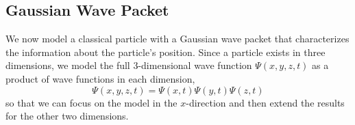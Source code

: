 \subsection{Gaussian Wave Packet}

We now model a classical particle with a Gaussian  wave packet that characterizes the information about the particle's position.  Since a particle exists in three dimensions, we model the full 3-dimensional wave function $\Psi(x,y,z,t)$ as a product of wave functions in each dimension,
%
\begin{equation}
\Psi(x,y,z,t) = \Psi(x,t)\Psi(y,t)\Psi(z,t)
\end{equation}
%
so that we can focus on the model in the $x$-direction and then extend the results for the other two dimensions.

